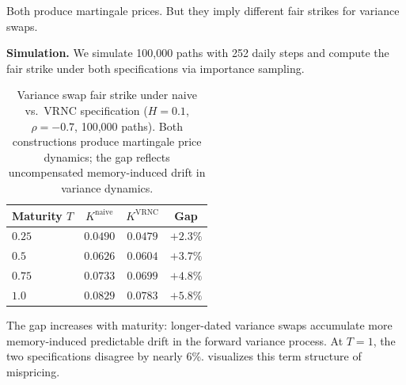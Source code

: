 \documentclass[11pt]{article}
\theoremstyle{plain}
\theoremstyle{definition}
\theoremstyle{remark}
\begin{document}
Both produce martingale prices. But they imply different fair strikes for
variance swaps.

\textbf{Simulation.} We simulate 100{,}000 paths with 252 daily steps and compute
the fair strike under both specifications via importance sampling.

\begin{table}[h]
\centering
\caption{Variance swap fair strike under naive vs.\ VRNC specification
($H = 0.1$, $\rho = -0.7$, 100{,}000 paths). Both constructions produce
martingale price dynamics; the gap reflects uncompensated memory-induced drift
in variance dynamics.}
\label{tab:var-swap}
\begin{tabular}{lccc}
\hline
\textbf{Maturity $T$} & $K^{\text{naive}}$ & $K^{\text{VRNC}}$ & \textbf{Gap} \\
\hline
$0.25$ & $0.0490$ & $0.0479$ & $+2.3\%$ \\
$0.5$ & $0.0626$ & $0.0604$ & $+3.7\%$ \\
$0.75$ & $0.0733$ & $0.0699$ & $+4.8\%$ \\
$1.0$ & $0.0829$ & $0.0783$ & $+5.8\%$ \\
\hline
\end{tabular}
\end{table}

The gap increases with maturity: longer-dated variance swaps accumulate more
memory-induced predictable drift in the forward variance process.
At $T = 1$, the two specifications disagree by nearly 6\%.
 visualizes this term structure of mispricing.
\end{document}
